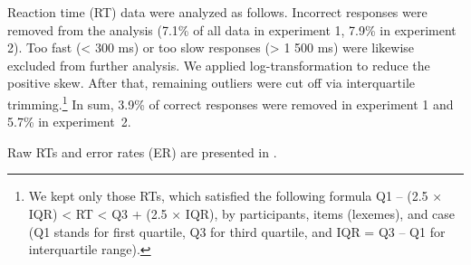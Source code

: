 \documentclass[output=paper, modfonts,newtxmath,hidelinks]{langscibook}
\begin{document}
Reaction time (RT) data were analyzed as follows. Incorrect responses were removed from the analysis (7.1\% of all data in experiment 1, 7.9\% in experiment 2). Too fast (< 300 ms) or too slow responses (> 1 500 ms) were likewise excluded from further analysis. We applied log-transformation to reduce the positive skew. After that, remaining outliers were cut off via interquartile trimming.\footnote{We kept only those RTs, which satisfied the following formula Q1 – (2.5 × IQR) < RT < Q3 + (2.5 × IQR), by participants, items (lexemes),  and case (Q1 stands for first quartile, Q3 for third quartile, and IQR = Q3 – Q1 for interquartile range).} In sum, 3.9\% of correct responses were removed in experiment 1 and 5.7\% in experiment~2.

Raw RTs and error rates (ER) are presented in .
\begin{table}
    \caption{Mean RT (in ms) and ER (in \%) to feminine and masculine nouns in different cases and numbers (\textit{SD} is provided in brackets)}
    \label{tab:descrSg}
\end{table}
\end{document}
